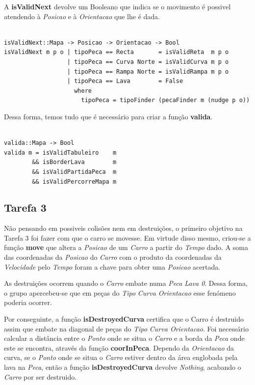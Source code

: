 \documentclass[a4paper]{report} %
\begin{document}
\normalsize



A \textbf{isValidNext} devolve um Booleano que indica se o movimento é possivel atendendo à \emph{Posicao} e à \emph{Orientacao} que lhe é dada.

\begin{verbatim}

isValidNext::Mapa -> Posicao -> Orientacao -> Bool
isValidNext m p o | tipoPeca == Recta       = isValidReta  m p o
                  | tipoPeca == Curva Norte = isValidCurva m p o
                  | tipoPeca == Rampa Norte = isValidRampa m p o
                  | tipoPeca == Lava        = False
                    where
                      tipoPeca = tipoFinder (pecaFinder m (nudge p o))

\end{verbatim}

Dessa forma, temos tudo que é necessário para criar a função \textbf{valida}.

\begin{verbatim}

valida::Mapa -> Bool
valida m = isValidTabuleiro    m
        && isBorderLava        m
        && isValidPartidaPeca  m
        && isValidPercorreMapa m

\end{verbatim}
\newpage

\subsection{Tarefa 3}

Não pensando em possiveis colisões nem em destruições, o primeiro objetivo na Tarefa 3 foi fazer com que o carro se movesse. Em virtude disso mesmo, criou-se a função \textbf{move} que altera a \emph{Posicao} de um \emph{Carro} a partir do \emph{Tempo} dado. A soma das coordenadas da \emph{Posicao} do \emph{Carro} com o produto da coordenadas da \emph{Velocidade} pelo \emph{Tempo} foram a chave para obter uma \emph{Posicao} acertada. 

As destruições ocorrem quando o \emph{Carro} embate numa \emph{Peca Lava 0}. Dessa forma, o grupo apercebeu-se que em peças do \emph{Tipo} \emph{Curva Orientacao} esse fenómeno poderia ocorrer.

Por conseguinte, a função \textbf{isDestroyedCurva} certifica que o Carro é destruido assim que embate na diagonal de peças do \emph{Tipo} \emph{Curva Orientacao}. Foi necessário calcular a distância entre o \emph{Ponto} onde se situa o \emph{Carro} e a borda da \emph{Peca} onde este se encontra, através da função \textbf{coorInPeca}. Dependo da \emph{Orientacao} da curva, se o \emph{Ponto} onde se situa o \emph{Carro} estiver dentro da área englobada pela lava na \emph{Peca}, então a função \textbf{isDestroyedCurva} devolve \emph{Nothing}, acabando o \emph{Carro} por ser destruido.
\end{document}
